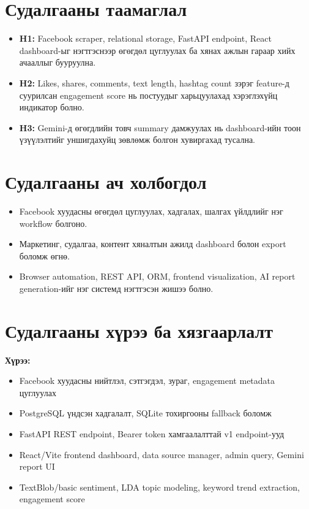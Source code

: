 \documentclass[
12pt,
oneside,
english,
onehalfspacing,
nolistspacing,
headsepline,
]{MUST-Thesis}
\begin{document}
\section{Судалгааны таамаглал}

\begin{itemize}
    \item \textbf{H1:} Facebook scraper, relational storage, FastAPI endpoint, React dashboard-ыг нэгтгэснээр өгөгдөл цуглуулах ба хянах ажлын гараар хийх ачааллыг бууруулна.
    \item \textbf{H2:} Likes, shares, comments, text length, hashtag count зэрэг feature-д суурилсан engagement score нь постуудыг харьцуулахад хэрэглэхүйц индикатор болно.
    \item \textbf{H3:} Gemini-д өгөгдлийн товч summary дамжуулах нь dashboard-ийн тоон үзүүлэлтийг уншигдахуйц зөвлөмж болгон хувиргахад тусална.
\end{itemize}

\section{Судалгааны ач холбогдол}

\begin{itemize}
    \item Facebook хуудасны өгөгдөл цуглуулах, хадгалах, шалгах үйлдлийг нэг workflow болгоно.
    \item Маркетинг, судалгаа, контент хяналтын ажилд dashboard болон export боломж өгнө.
    \item Browser automation, REST API, ORM, frontend visualization, AI report generation-ийг нэг системд нэгтгэсэн жишээ болно.
\end{itemize}

\section{Судалгааны хүрээ ба хязгаарлалт}

\textbf{Хүрээ:}
\begin{itemize}
    \item Facebook хуудасны нийтлэл, сэтгэгдэл, зураг, engagement metadata цуглуулах
    \item PostgreSQL үндсэн хадгалалт, SQLite тохиргооны fallback боломж
    \item FastAPI REST endpoint, Bearer token хамгаалалттай v1 endpoint-ууд
    \item React/Vite frontend dashboard, data source manager, admin query, Gemini report UI
    \item TextBlob/basic sentiment, LDA topic modeling, keyword trend extraction, engagement score
\end{itemize}
\end{document}

